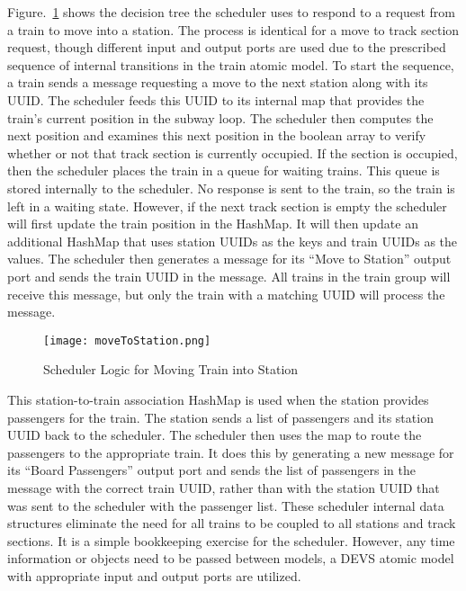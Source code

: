 Figure.~\ref{fig:movetostation} shows the decision tree the scheduler uses to respond to a request from a train to move into a station. The process is identical for a move to track section request, though different input and output ports are used due to the prescribed sequence of internal transitions in the train atomic model. To start the sequence, a train sends a message requesting a move to the next station along with its UUID.  The scheduler feeds this UUID to its internal map that provides the train's current position in the subway loop.  The scheduler then computes the next position and examines this next position in the boolean array to verify whether or not that track section is currently occupied.  If the section is occupied, then the scheduler places the train in a queue for waiting trains.  This queue is stored internally to the scheduler.  No response is sent to the train, so the train is left in a waiting state.  However, if the next track section is empty the scheduler will first update the train position in the HashMap.  It will then update an additional HashMap that uses station UUIDs as the keys and train UUIDs as the values.  The scheduler then generates a message for its ``Move to Station'' output port and sends the train UUID in the message.  All trains in the train group will receive this message, but only the train with a matching UUID will process the message.
\begin{figure}[htb]
	\centering
	\texttt{[image: moveToStation.png]}
	\caption{Scheduler Logic for Moving Train into Station}
	\label{fig:movetostation}
\end{figure}

This station-to-train association HashMap is used when the station provides passengers for the train. The station sends a list of passengers and its station UUID back to the scheduler.  The scheduler then uses the map to route the passengers to the appropriate train.  It does this by generating a new message for its ``Board Passengers'' output port and sends the list of passengers in the message with the correct train UUID, rather than with the station UUID that was sent to the scheduler with the passenger list.  These scheduler internal data structures eliminate the need for all trains to be coupled to all stations and track sections.  It is a simple bookkeeping exercise for the scheduler.  However, any time information or objects need to be passed between models, a DEVS atomic model with appropriate input and output ports are utilized.
%

